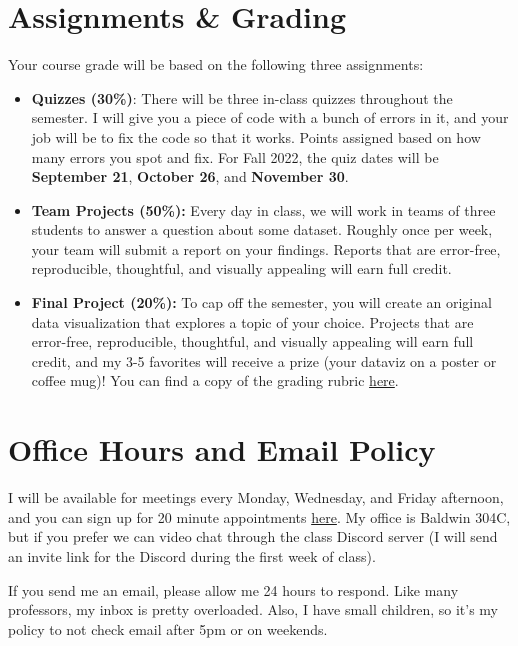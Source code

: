 \documentclass[11pt, letterpaper]{article}
\begin{document}
\section*{Assignments \& Grading}

Your course grade will be based on the following three assignments:

\begin{itemize}
	\item \textbf{Quizzes (30\%)}: There will be three in-class quizzes throughout the semester. I will give you a piece of code with a bunch of errors in it, and your job will be to fix the code so that it works. Points assigned based on how many errors you spot and fix. For Fall 2022, the quiz dates will be \textbf{September 21}, \textbf{October 26}, and \textbf{November 30}.
	\item \textbf{Team Projects (50\%):} Every day in class, we will work in teams of three students to answer a question about some dataset. Roughly once per week, your team will submit a report on your findings. Reports that are error-free, reproducible, thoughtful, and visually appealing will earn full credit.
	\item \textbf{Final Project (20\%):} To cap off the semester, you will create an original data visualization that explores a topic of your choice. Projects that are error-free, reproducible, thoughtful, and visually appealing will earn full credit, and my 3-5 favorites will receive a prize (your dataviz on a poster or coffee mug)! You can find a copy of the grading rubric \href{https://joeornstein.github.io/pols-3230/syllabus/POLS-3230-final-rubric.xlsx}{here}.
\end{itemize}

\section*{Office Hours and Email Policy}
I will be available for meetings every Monday, Wednesday, and Friday afternoon, and you can sign up for 20 minute appointments \href{https://calendly.com/joeornstein/20min}{here}. My office is Baldwin 304C, but if you prefer we can video chat through the class Discord server (I will send an invite link for the Discord during the first week of class).

If you send me an email, please allow me 24 hours to respond. Like many professors, my inbox is pretty overloaded. Also, I have small children, so it's my policy to not check email after 5pm or on weekends. 
\end{document}
